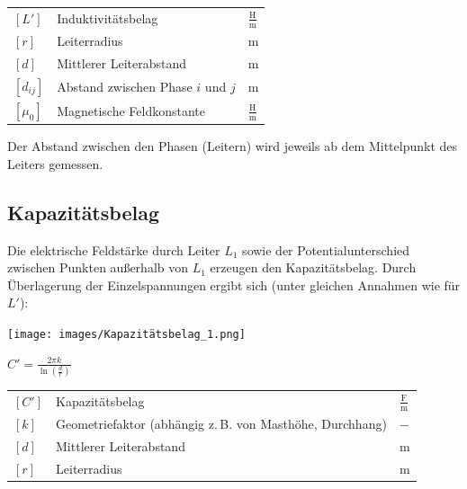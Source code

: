 \vspace{0.15cm}

\renewcommand{\arraystretch}{1.2}
\begin{tabular}{@{} l p{6cm} l @{}}
    $[L']$     & Induktivitätsbelag \dotfill & $\frac{\text{H}}{\text{m}}$ \\
    $[r]$      & Leiterradius \dotfill & $\text{m}$ \\
    $[d]$      & Mittlerer Leiterabstand \dotfill & $\text{m}$ \\
    $[d_{ij}]$ & Abstand zwischen Phase $i$ und $j$ \dotfill & $\text{m}$ \\
    $[\mu_0]$  & Magnetische Feldkonstante  \dotfill & $\frac{\text{H}}{\text{m}}$ \\
\end{tabular}

\vspace{0.15cm}

Der Abstand zwischen den Phasen (Leitern) wird jeweils ab dem Mittelpunkt des Leiters gemessen.


\subsection{Kapazitätsbelag}

Die elektrische Feldstärke durch Leiter $L_1$ sowie der Potentialunterschied zwischen Punkten außerhalb von $L_1$ erzeugen den Kapazitätsbelag. Durch Überlagerung der Einzelspannungen ergibt sich (unter gleichen Annahmen wie für $L'$):

\texttt{[image: images/Kapazitätsbelag\_1.png]}

\vspace{0.15cm}

$
\boxed{C' = \frac{2 \pi k}{\ln\left(\frac{d}{r}\right)}}
$

\vspace{0.15cm}

\renewcommand{\arraystretch}{1.2}
\begin{tabular}{@{} l p{8cm} l @{}}
$[C']$     & Kapazitätsbelag \dotfill & $\frac{\text{F}}{\text{m}}$ \\
$[k]$      & Geometriefaktor (abhängig z.\,B. von Masthöhe, Durchhang) \dotfill & $-$ \\
$[d]$      & Mittlerer Leiterabstand \dotfill & $\text{m}$ \\
$[r]$      & Leiterradius \dotfill & $\text{m}$ \\
\end{tabular}



